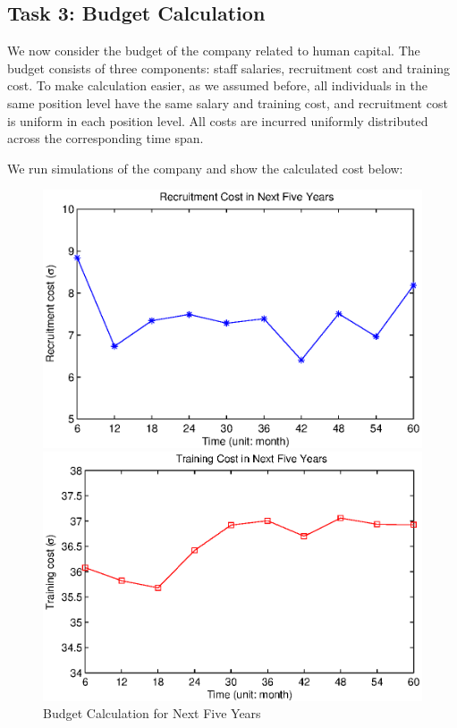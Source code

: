 \documentclass[tcn = 37075, sheet = false, abstract = false]{mcmthesis}
\begin{document}
\subsection{Task 3: Budget Calculation}

We now consider the budget of the company related to human capital. The budget consists of three components: staff salaries, recruitment cost and training cost. To make calculation easier, as we assumed before, all individuals in the same position level have the same salary and training cost, and recruitment cost is uniform in each position level. All costs are incurred uniformly distributed across the corresponding time span.

We run simulations of the company and show the calculated cost below:

\begin{figure}[htbp]
\begin{minipage}[t]{0.5\linewidth}
\centering
\includegraphics[width=1.0\textwidth]{Recruitment_Cost.eps}
\end{minipage}%
\begin{minipage}[t]{0.5\linewidth}
\centering
\includegraphics[width=1.0\textwidth]{Training_Cost.eps}
\end{minipage}%
\label{fig:bb5}
\caption{Budget Calculation for Next Five Years}
\end{figure}
\end{document}
